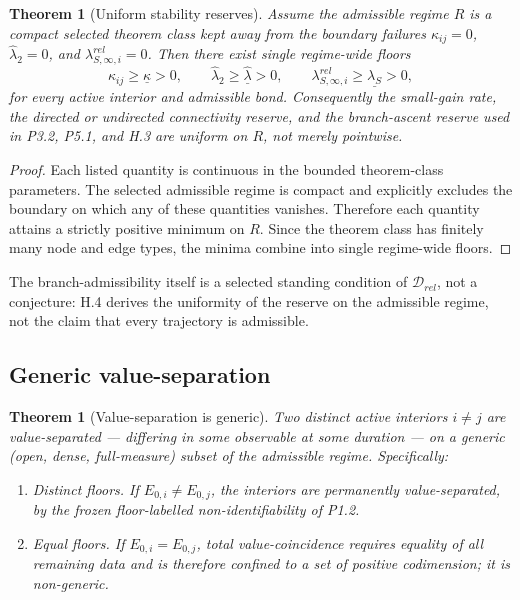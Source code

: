 \documentclass[11pt,a4paper]{article}
\def\mathfrak#1{#1}%
\def\mathrm#1{#1}%
\def\emph#1{#1}%
\theoremstyle{definition}
\theoremstyle{plain}
\newtheorem{theorem}[definition]{Theorem}
\theoremstyle{remark}
\begin{document}
\begin{theorem}[Uniform stability reserves]\label{thm:unifconst}
Assume the admissible regime \(\mathfrak R\) is a compact selected theorem class kept away
from the boundary failures \(\kappa_{ij}=0\), \(\widehat\lambda_2=0\), and
\(\lambda_{S,\infty,i}^{\mathrm{rel}}=0\). Then there exist single regime-wide floors
\[
\boxed{\;
\kappa_{ij}\ge\underline\kappa>0,
\qquad
\widehat\lambda_2\ge\underline{\widehat\lambda}>0,
\qquad
\lambda_{S,\infty,i}^{\mathrm{rel}}\ge\underline{\lambda_S}>0,
\;}
\]
for every active interior and admissible bond. Consequently the small-gain rate, the directed
or undirected connectivity reserve, and the branch-ascent reserve used in P3.2, P5.1, and H.3
are uniform on \(\mathfrak R\), not merely pointwise.
\end{theorem}

\begin{proof}
Each listed quantity is continuous in the bounded theorem-class parameters. The selected
admissible regime is compact and explicitly excludes the boundary on which any of these
quantities vanishes. Therefore each quantity attains a strictly positive minimum on
\(\mathfrak R\). Since the theorem class has finitely many node and edge types, the minima
combine into single regime-wide floors. \qedhere
\end{proof}

\noindent The branch-admissibility itself is a \emph{selected} standing condition of
\(\mathcal D_{\mathrm{rel}}\), not a conjecture: H.4 derives the \emph{uniformity} of the
reserve on the admissible regime, not the claim that every trajectory is admissible.

\subsection{Generic value-separation}

\begin{theorem}[Value-separation is generic]\label{thm:valuesep}
Two distinct active interiors \(i\neq j\) are value-separated --- differing in some observable
at some duration --- on a generic (open, dense, full-measure) subset of the admissible regime.
Specifically:
\begin{enumerate}[label=\textup{(\alph*)},leftmargin=1.2cm]
\item \emph{Distinct floors.} If \(E_{0,i}\neq E_{0,j}\), the interiors are permanently
value-separated, by the frozen floor-labelled non-identifiability of P1.2.
\item \emph{Equal floors.} If \(E_{0,i}=E_{0,j}\), total value-coincidence requires equality
of all remaining data and is therefore confined to a set of positive codimension; it is
non-generic.
\end{enumerate}
\end{theorem}
\end{document}
